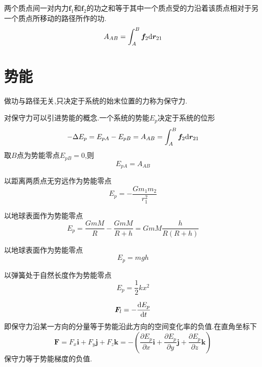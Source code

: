 \dya[一对内力的功] 两个质点间一对内力$\bm{f}_1$和$\bm{f}_2$的功之和等于其中一个质点受的力沿着该质点相对于另一个质点所移动的路径所作的功.
\begin{equation}
A_{AB}=\int_{A}^{B}\bm{f}_2 {\rm{d}} \bm{r}_{21}
\end{equation}

\section{势能}
\par {}做功与路径无关,只决定于系统的始末位置的力称为保守力.\jg
\par {} 对保守力可以引进势能的概念.一个系统的势能$E_p$决定于系统的位形
\begin{equation}
-\Delta E_p=E_{pA}-E_{pB}=A_{AB}=\int_{A}^{B}\bm{f}_2 {\rm{d}} \bm{r}_{21}
\end{equation}
取$B$点为势能零点$E_{pB}=0$,则
\begin{equation}
E_{pA}=A_{AB}
\end{equation}
\par {}  \jg
\par 以距离两质点无穷远作为势能零点
\begin{equation}
E_p=-\frac{Gm_1m_2}{r_1^2}
\end{equation}
\par 以地球表面作为势能零点
\begin{equation}
E_p=\frac{GmM}{R}-\frac{GmM}{R+h}=GmM\frac{h}{R(R+h)}
\end{equation}

\par {} \jg
\par 以地球表面作为势能零点
\begin{equation}
E_p=mgh
\end{equation}

\par {} \jg
\par 以弹簧处于自然长度作为势能零点
\begin{equation}
E_p=\frac{1}{2}kx^2
\end{equation}

\par \dya[由势能求保守力]
\begin{equation}
\bm{F}_l=-\frac{{\rm{d}} E_p}{{\rm{d}} t}
\end{equation}
即保守力沿某一方向的分量等于势能沿此方向的空间变化率的负值.在直角坐标下
\begin{equation}
\bm{F}=F_x\bm{i}+F_y\bm{j}+F_z\bm{k}=-\left( \frac{\partial E_p}{\partial x}\bm{i}+\frac{\partial E_p}{\partial y}\bm{j}+\frac{\partial E_p}{\partial z}\bm{k}\right) 
\end{equation}
保守力等于势能梯度的负值.

